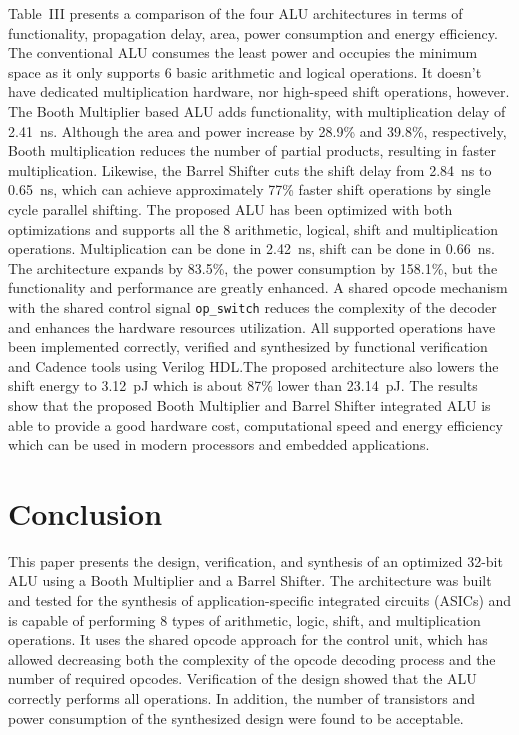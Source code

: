 \documentclass[conference]{IEEEtran}
\begin{document}
Table~III presents a comparison of the four ALU architectures in terms of functionality, propagation delay, area, power consumption and energy efficiency. The conventional ALU consumes the least power and occupies the minimum space as it only supports 6 basic arithmetic and logical operations. It doesn't have dedicated multiplication hardware, nor high-speed shift operations, however. The Booth Multiplier based ALU adds functionality, with multiplication delay of 2.41~ns. Although the area and power increase by 28.9\% and 39.8\%, respectively, Booth multiplication reduces the number of partial products, resulting in faster multiplication. Likewise, the Barrel Shifter cuts the shift delay from 2.84~ns to 0.65~ns, which can achieve approximately 77\% faster shift operations by single cycle parallel shifting. The proposed ALU has been optimized with both optimizations and supports all the 8 arithmetic, logical, shift and multiplication operations. Multiplication can be done in 2.42~ns, shift can be done in 0.66~ns. The architecture expands by 83.5\%, the power consumption by 158.1\%, but the functionality and performance are greatly enhanced. A shared opcode mechanism with the shared control signal \texttt{op\_switch} reduces the complexity of the decoder and enhances the hardware resources utilization. All supported operations have been implemented correctly, verified and synthesized by functional verification and Cadence tools using Verilog HDL.The proposed architecture also lowers the shift energy to 3.12~pJ which is about 87\% lower than 23.14~pJ. The results show that the proposed Booth Multiplier and Barrel Shifter integrated ALU is able to provide a good hardware cost, computational speed and energy efficiency which can be used in modern processors and embedded applications.

\section{Conclusion}

This paper presents the design, verification, and synthesis of an optimized 32-bit ALU using a Booth Multiplier and a Barrel Shifter. The architecture was built and tested for the synthesis of application-specific integrated circuits (ASICs) and is capable of performing 8 types of arithmetic, logic, shift, and multiplication operations. It uses the shared opcode approach for the control unit, which has allowed decreasing both the complexity of the opcode decoding process and the number of required opcodes. Verification of the design showed that the ALU correctly performs all operations. In addition, the number of transistors and power consumption of the synthesized design were found to be acceptable.
\end{document}
